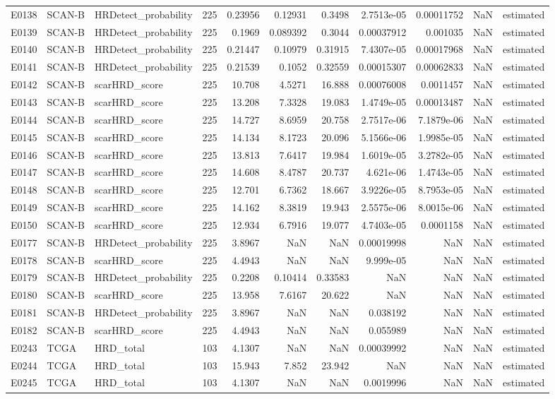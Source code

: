 \begin{longtable}{lllrrrrrrrl}
E0138 & SCAN-B & HRDetect\_probability & 225 & 0.23956 & 0.12931 & 0.3498 & 2.7513e-05 & 0.00011752 & NaN & estimated \\
E0139 & SCAN-B & HRDetect\_probability & 225 & 0.1969 & 0.089392 & 0.3044 & 0.00037912 & 0.001035 & NaN & estimated \\
E0140 & SCAN-B & HRDetect\_probability & 225 & 0.21447 & 0.10979 & 0.31915 & 7.4307e-05 & 0.00017968 & NaN & estimated \\
E0141 & SCAN-B & HRDetect\_probability & 225 & 0.21539 & 0.1052 & 0.32559 & 0.00015307 & 0.00062833 & NaN & estimated \\
E0142 & SCAN-B & scarHRD\_score & 225 & 10.708 & 4.5271 & 16.888 & 0.00076008 & 0.0011457 & NaN & estimated \\
E0143 & SCAN-B & scarHRD\_score & 225 & 13.208 & 7.3328 & 19.083 & 1.4749e-05 & 0.00013487 & NaN & estimated \\
E0144 & SCAN-B & scarHRD\_score & 225 & 14.727 & 8.6959 & 20.758 & 2.7517e-06 & 7.1879e-06 & NaN & estimated \\
E0145 & SCAN-B & scarHRD\_score & 225 & 14.134 & 8.1723 & 20.096 & 5.1566e-06 & 1.9985e-05 & NaN & estimated \\
E0146 & SCAN-B & scarHRD\_score & 225 & 13.813 & 7.6417 & 19.984 & 1.6019e-05 & 3.2782e-05 & NaN & estimated \\
E0147 & SCAN-B & scarHRD\_score & 225 & 14.608 & 8.4787 & 20.737 & 4.621e-06 & 1.4743e-05 & NaN & estimated \\
E0148 & SCAN-B & scarHRD\_score & 225 & 12.701 & 6.7362 & 18.667 & 3.9226e-05 & 8.7953e-05 & NaN & estimated \\
E0149 & SCAN-B & scarHRD\_score & 225 & 14.162 & 8.3819 & 19.943 & 2.5575e-06 & 8.0015e-06 & NaN & estimated \\
E0150 & SCAN-B & scarHRD\_score & 225 & 12.934 & 6.7916 & 19.077 & 4.7403e-05 & 0.0001158 & NaN & estimated \\
E0177 & SCAN-B & HRDetect\_probability & 225 & 3.8967 & NaN & NaN & 0.00019998 & NaN & NaN & estimated \\
E0178 & SCAN-B & scarHRD\_score & 225 & 4.4943 & NaN & NaN & 9.999e-05 & NaN & NaN & estimated \\
E0179 & SCAN-B & HRDetect\_probability & 225 & 0.2208 & 0.10414 & 0.33583 & NaN & NaN & NaN & estimated \\
E0180 & SCAN-B & scarHRD\_score & 225 & 13.958 & 7.6167 & 20.622 & NaN & NaN & NaN & estimated \\
E0181 & SCAN-B & HRDetect\_probability & 225 & 3.8967 & NaN & NaN & 0.038192 & NaN & NaN & estimated \\
E0182 & SCAN-B & scarHRD\_score & 225 & 4.4943 & NaN & NaN & 0.055989 & NaN & NaN & estimated \\
E0243 & TCGA & HRD\_total & 103 & 4.1307 & NaN & NaN & 0.00039992 & NaN & NaN & estimated \\
E0244 & TCGA & HRD\_total & 103 & 15.943 & 7.852 & 23.942 & NaN & NaN & NaN & estimated \\
E0245 & TCGA & HRD\_total & 103 & 4.1307 & NaN & NaN & 0.0019996 & NaN & NaN & estimated \\
\end{longtable}
